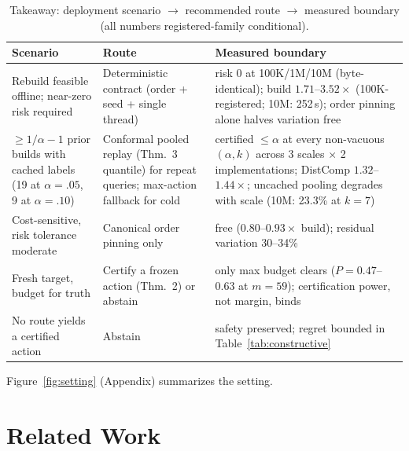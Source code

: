 \documentclass{article}
\begin{document}
\begin{table}[t]
\centering
\caption{Takeaway: deployment scenario $\rightarrow$ recommended route $\rightarrow$ measured boundary (all numbers registered-family conditional).}
\label{tab:takeaway}
\footnotesize
\setlength{\tabcolsep}{3pt}
\begin{tabular}{p{3.2cm}p{3.9cm}p{6.5cm}}
\toprule
Scenario & Route & Measured boundary \\
\midrule
Rebuild feasible offline; near-zero risk required & Deterministic contract (order + seed + single thread) & risk 0 at 100K/1M/10M (byte-identical); build $1.71$--$3.52\times$ (100K-registered; 10M: 252\,s); order pinning alone halves variation free \\
$\ge 1/\alpha-1$ prior builds with cached labels (19 at $\alpha{=}.05$, 9 at $\alpha{=}.10$) & Conformal pooled replay (Thm.~3 quantile) for repeat queries; max-action fallback for cold & certified $\le\alpha$ at every non-vacuous $(\alpha,k)$ across 3 scales $\times$ 2 implementations; DistComp $1.32$--$1.44\times$; uncached pooling degrades with scale (10M: 23.3\% at $k{=}7$) \\
Cost-sensitive, risk tolerance moderate & Canonical order pinning only & free ($0.80$--$0.93\times$ build); residual variation 30--34\% \\
Fresh target, budget for truth & Certify a frozen action (Thm.~2) or abstain & only max budget clears ($P{=}0.47$--$0.63$ at $m{=}59$); certification power, not margin, binds \\
No route yields a certified action & Abstain & safety preserved; regret bounded in Table~\ref{tab:constructive} \\
\bottomrule
\end{tabular}
\end{table}


Figure~\ref{fig:setting} (Appendix) summarizes the setting.

\section{Related Work}
\label{sec:related}
\end{document}
